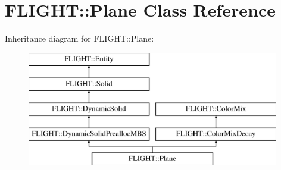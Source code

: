 \hypertarget{class_f_l_i_g_h_t_1_1_plane}{}\section{F\+L\+I\+G\+HT\+:\+:Plane Class Reference}
\label{class_f_l_i_g_h_t_1_1_plane}
Inheritance diagram for F\+L\+I\+G\+HT\+:\+:Plane\+:\begin{figure}[H]
\begin{center}
\leavevmode
\includegraphics[height=5.000000cm]{class_f_l_i_g_h_t_1_1_plane}
\end{center}
\end{figure}
